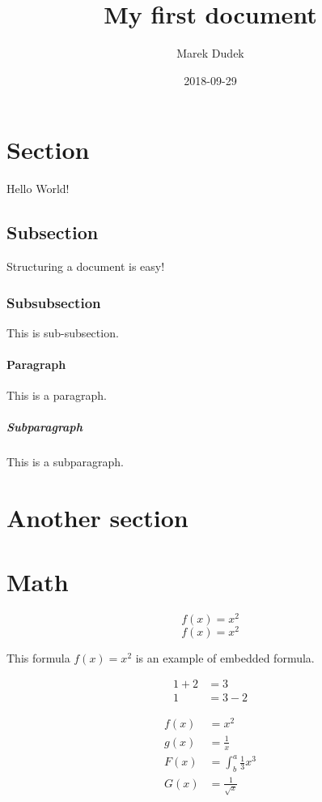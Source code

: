 \documentclass{article}
\title{My first document}
\date{2018-09-29}
\author{Marek Dudek}
\begin{document}
    \maketitle
    \newpage

    \section{Section}
    Hello World!
    \subsection{Subsection}
    Structuring a document is easy!
    \subsubsection{Subsubsection}
    This is sub-subsection.
    \paragraph{Paragraph}
    This is a paragraph.
    \subparagraph{Subparagraph}
    This is a subparagraph.

    \section{Another section}

    \section{Math}

	    \begin{equation}
		f(x) = x^2
	    \end{equation}
	    \begin{equation*}
		f(x) = x^2
	    \end{equation*}

        This formula $f(x) = x^2$ is an example of embedded formula.

    \begin{align*}
 	1 + 2 &= 3\\
 	1 &= 3 - 2
    \end{align*}

    \begin{align*}
 	f(x) &= x^2\\
	g(x) &= \frac{1}{x}\\
	F(x) &= \int^a_b \frac{1}{3}x^3\\
	G(x) &= \frac{1}{\sqrt{x}}
    \end{align*}
\end{document}
